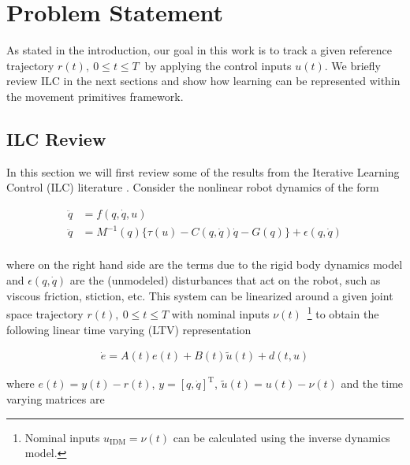 \documentclass[10pt,a4paper]{article}
\newcommand{\joint}{q} %
\newcommand{\state}{y} %
\newcommand{\error}{e} %
\newcommand{\traj}{r} %
\newcommand{\dist}{\epsilon} %
\newcommand{\linDist}{d} %
\newcommand{\sysInput}{u} %
\newcommand{\linInput}{\tilde{u}} %
\newcommand{\trjInput}{\nu} %
\newcommand{\dynamics}{f}
\begin{document}
\section{Problem Statement}\label{problemStatement}

As stated in the introduction, our goal in this work is to track a given reference trajectory $\traj(t), \ 0 \leq t \leq T \ $ by applying the control inputs $\sysInput(t)$. We briefly review ILC in the next sections and show how learning can be represented within the movement primitives framework.

\subsection{ILC Review}\label{ilcReview}

In this section we will first review some of the results from the Iterative Learning Control (ILC) literature \cite{Bristow06}. Consider the nonlinear robot dynamics of the form

\begin{equation}
\begin{aligned}
\ddot{\joint} &= \dynamics(\joint,\dot{\joint},\sysInput) \\
\ddot{\joint} &= M^{-1}(\joint)\{ \tau(\sysInput) - C(\joint,\dot{\joint})\dot{\joint} - G(\joint)\} + \dist(\joint,\dot{\joint})\\
\end{aligned}
\label{dynamics}
\end{equation}

\noindent where on the right hand side are the terms due to the rigid body dynamics model and $\dist(\joint,\dot{\joint})$ are the (unmodeled) disturbances that act on the robot, such as viscous friction, stiction, etc. This system can be linearized around a given joint space trajectory $\traj(t), \ 0 \leq t \leq T$ with nominal inputs $\nu(t)$~\footnote{Nominal inputs $\sysInput_{\mathrm{IDM}} = \nu(t)$ can be calculated using the inverse dynamics model.} to obtain the following linear time varying (LTV) representation

\begin{equation}
\begin{aligned}
\dot{\error} = A(t)\error(t) + B(t)\linInput(t) + \linDist(t,\sysInput)
\end{aligned}
\label{LTV}
\end{equation}

\noindent where $\error(t) = \state(t) - \traj(t)$, $\state = [\joint,\dot{\joint}]^{\mathrm{T}}$, $\linInput(t) = \sysInput(t) - \trjInput(t)$ and the time varying matrices are
\end{document}

